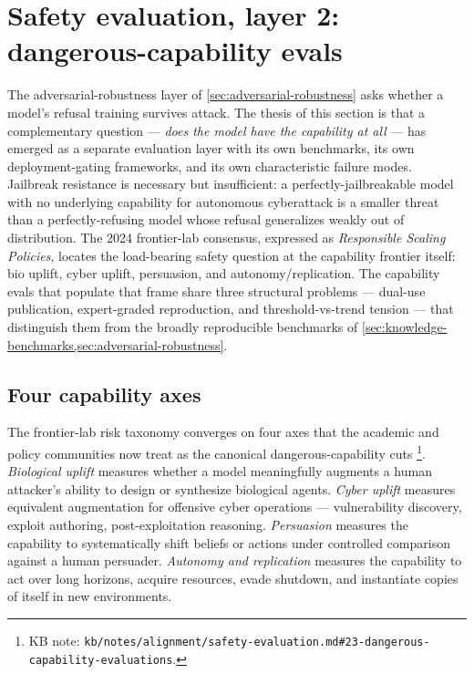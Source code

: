
\section{Safety evaluation, layer 2: dangerous-capability evals}
\label{sec:dangerous-capability}

The adversarial-robustness layer of \cref{sec:adversarial-robustness}
asks whether a model's refusal training survives attack. The thesis of
this section is that a complementary question --- \emph{does the model
have the capability at all} --- has emerged as a separate evaluation
layer with its own benchmarks, its own deployment-gating frameworks,
and its own characteristic failure modes. Jailbreak resistance is
necessary but insufficient: a perfectly-jailbreakable model with no
underlying capability for autonomous cyberattack is a smaller threat
than a perfectly-refusing model whose refusal generalizes weakly out
of distribution. The 2024 frontier-lab consensus, expressed as
\emph{Responsible Scaling Policies}, locates the load-bearing safety
question at the capability frontier itself: bio uplift, cyber uplift,
persuasion, and autonomy/replication. The capability evals that
populate that frame share three structural problems --- dual-use
publication, expert-graded reproduction, and threshold-vs-trend
tension --- that distinguish them from the broadly reproducible
benchmarks of \cref{sec:knowledge-benchmarks,sec:adversarial-robustness}.

\subsection{Four capability axes}
\label{sec:dangerous-capability-axes}

The frontier-lab risk taxonomy converges on four axes that the
academic and policy communities now treat as the canonical
dangerous-capability cuts%
\footnote{KB note: \texttt{kb/notes/alignment/safety-evaluation.md\#23-dangerous-capability-evaluations}.}.
\emph{Biological uplift} measures whether a model meaningfully
augments a human attacker's ability to design or synthesize biological
agents. \emph{Cyber uplift} measures equivalent augmentation for
offensive cyber operations --- vulnerability discovery, exploit
authoring, post-exploitation reasoning. \emph{Persuasion}
measures the capability to systematically shift beliefs or actions
under controlled comparison against a human persuader. \emph{Autonomy
and replication} measures the capability to act over long horizons,
acquire resources, evade shutdown, and instantiate copies of itself
in new environments.

